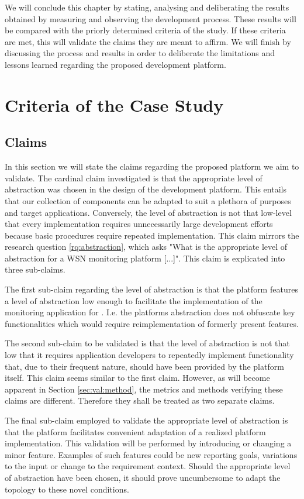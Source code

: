 We will conclude this chapter by stating, analysing and deliberating the results obtained by measuring and observing the development process. These results will be compared with the priorly determined criteria of the study. If these criteria are met, this will validate the claims they are meant to affirm. We will finish by discussing the process and results in order to deliberate the limitations and lessons learned regarding the proposed development platform.
	
\section{Criteria of the Case Study}
\subsection{Claims}
\label{sec:claims}
In this section we will state the claims regarding the proposed platform we aim to validate. The cardinal claim investigated is that the appropriate level of abstraction was chosen in the design of the development platform. This entails that our collection of components can be adapted to suit a plethora of purposes and target applications. Conversely, the level of abstraction is not that low-level that every implementation requires unnecessarily large development efforts because basic procedures require repeated implementation. This claim mirrors the research question \ref{rq:abstraction}, which asks "What is the appropriate level of abstraction for a WSN monitoring platform [...]". This claim is explicated into three sub-claims.

The first sub-claim regarding the level of abstraction is that the platform features a level of abstraction low enough to facilitate the implementation of the monitoring application for \sensit. I.e. the platforms abstraction does not obfuscate key functionalities which would require reimplementation of formerly present features. 

The second sub-claim to be validated is that the level of abstraction is not that low that it requires application developers to repeatedly implement functionality that, due to their frequent nature, should have been provided by the platform itself. This claim seems similar to the first claim. However, as will become apparent in Section \ref{sec:val:method}, the metrics and methods verifying these claims are different. Therefore they shall be treated as two separate claims.

The final sub-claim employed to validate the appropriate level of abstraction is that the platform facilitates convenient adaptation of a realized platform implementation. This validation will be performed by introducing or changing a minor feature. Examples of such features could be new reporting goals, variations to the input or change to the requirement context. Should the appropriate level of abstraction have been chosen, it should prove uncumbersome to adapt the topology to these novel conditions.

